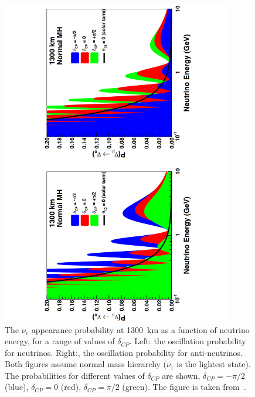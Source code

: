 \begin{figure}
  \centering 
  \includegraphics[width=0.9\textwidth]{DUNEOscillProb}
  \caption[The $\nu_e$ appearance probability at 1300~km as a function of neutrino energy, for a range of values of $\delta_{CP}$]
          {The $\nu_e$ appearance probability at 1300~km as a function of neutrino energy, for a range of values of $\delta_{CP}$. Left: the oscillation probability for neutrinos. Right:, the oscillation probability for anti-neutrinos. Both figures assume normal mass hierarchy ($\nu_1$ is the lightest state). The probabilities for different values of $\delta_{CP}$ are shown, $\delta_{CP} = -\pi/2$ (blue), $\delta_{CP} = 0$ (red), $\delta_{CP} = \pi/2$ (green). The figure is taken from~\citep{DUNECDR_V2}.}
  \label{fig:DUNEOscillProb}
\end{figure}

